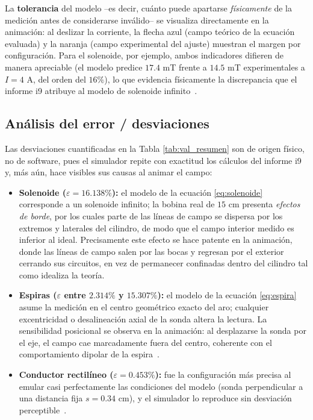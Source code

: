 \documentclass{article}
\begin{document}
La \textbf{tolerancia} del modelo --es decir, cuánto puede apartarse \emph{físicamente} de la medición antes de considerarse inválido-- se visualiza directamente en la animación: al deslizar la corriente, la flecha azul (campo teórico de la ecuación evaluada) y la naranja (campo experimental del ajuste) muestran el margen por configuración. Para el solenoide, por ejemplo, ambos indicadores difieren de manera apreciable (el modelo predice $17.4$ mT frente a $14.5$ mT experimentales a $I = 4$ A, del orden del $16\%$), lo que evidencia físicamente la discrepancia que el informe i9 atribuye al modelo de solenoide infinito~\cite{labi9rep}.

\subsection{Análisis del error / desviaciones} \label{sec:errores}

Las desviaciones cuantificadas en la Tabla \ref{tab:val_resumen} son de origen físico, no de software, pues el simulador repite con exactitud los cálculos del informe i9~\cite{labi9rep} y, más aún, hace visibles sus causas al animar el campo:

\begin{itemize}
    \item \textbf{Solenoide ($\varepsilon = 16.138\%$):} el modelo de la ecuación \eqref{eq:solenoide} corresponde a un solenoide infinito; la bobina real de $15$ cm presenta \emph{efectos de borde}, por los cuales parte de las líneas de campo se dispersa por los extremos y laterales del cilindro, de modo que el campo interior medido es inferior al ideal. Precisamente este efecto se hace patente en la animación, donde las líneas de campo salen por las bocas y regresan por el exterior cerrando sus circuitos, en vez de permanecer confinadas dentro del cilindro tal como idealiza la teoría\cite{labi9rep}.
    \item \textbf{Espiras ($\varepsilon$ entre $2.314\%$ y $15.307\%$):} el modelo de la ecuación \eqref{eq:espira} asume la medición en el centro geométrico exacto del aro; cualquier excentricidad o desalineación axial de la sonda altera la lectura. La sensibilidad posicional se observa en la animación: al desplazarse la sonda por el eje, el campo cae marcadamente fuera del centro, coherente con el comportamiento dipolar de la espira~\cite{labi9rep}.
    \item \textbf{Conductor rectilíneo ($\varepsilon = 0.453\%$):} fue la configuración más precisa al emular casi perfectamente las condiciones del modelo (sonda perpendicular a una distancia fija $s = 0.34$ cm), y el simulador lo reproduce sin desviación perceptible~\cite{labi9rep}.
\end{itemize}
\end{document}
